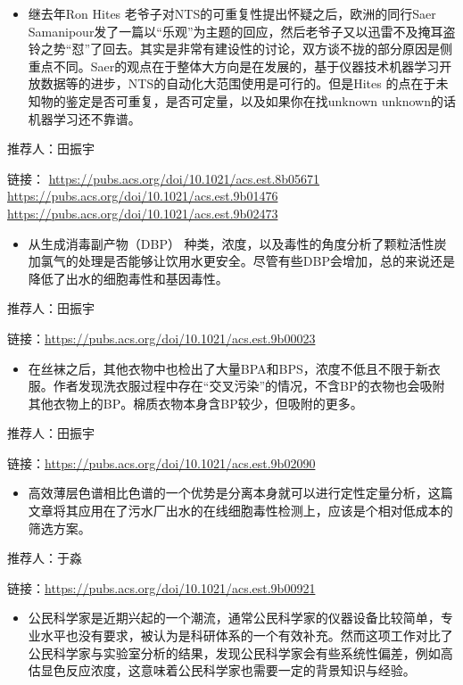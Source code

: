 \documentclass[
]{book}
\providecommand{\tightlist}{%
  \setlength{\itemsep}{0pt}\setlength{\parskip}{0pt}}
\begin{document}
\begin{itemize}
\tightlist
\item
  继去年Ron Hites 老爷子对NTS的可重复性提出怀疑之后，欧洲的同行Saer Samanipour发了一篇以``乐观''为主题的回应，然后老爷子又以迅雷不及掩耳盗铃之势``怼''了回去。其实是非常有建设性的讨论，双方谈不拢的部分原因是侧重点不同。Saer的观点在于整体大方向是在发展的，基于仪器技术机器学习开放数据等的进步，NTS的自动化大范围使用是可行的。但是Hites 的点在于未知物的鉴定是否可重复，是否可定量，以及如果你在找unknown unknown的话机器学习还不靠谱。
\end{itemize}

推荐人：田振宇

链接：
\url{https://pubs.acs.org/doi/10.1021/acs.est.8b05671}
\url{https://pubs.acs.org/doi/10.1021/acs.est.9b01476}
\url{https://pubs.acs.org/doi/10.1021/acs.est.9b02473}

\begin{itemize}
\tightlist
\item
  从生成消毒副产物（DBP） 种类，浓度，以及毒性的角度分析了颗粒活性炭加氯气的处理是否能够让饮用水更安全。尽管有些DBP会增加，总的来说还是降低了出水的细胞毒性和基因毒性。
\end{itemize}

推荐人：田振宇

链接：\url{https://pubs.acs.org/doi/10.1021/acs.est.9b00023}

\begin{itemize}
\tightlist
\item
  在丝袜之后，其他衣物中也检出了大量BPA和BPS，浓度不低且不限于新衣服。作者发现洗衣服过程中存在``交叉污染''的情况，不含BP的衣物也会吸附其他衣物上的BP。棉质衣物本身含BP较少，但吸附的更多。
\end{itemize}

推荐人：田振宇

链接：\url{https://pubs.acs.org/doi/10.1021/acs.est.9b02090}

\begin{itemize}
\tightlist
\item
  高效薄层色谱相比色谱的一个优势是分离本身就可以进行定性定量分析，这篇文章将其应用在了污水厂出水的在线细胞毒性检测上，应该是个相对低成本的筛选方案。
\end{itemize}

推荐人：于淼

链接：\url{https://pubs.acs.org/doi/10.1021/acs.est.9b00921}

\begin{itemize}
\tightlist
\item
  公民科学家是近期兴起的一个潮流，通常公民科学家的仪器设备比较简单，专业水平也没有要求，被认为是科研体系的一个有效补充。然而这项工作对比了公民科学家与实验室分析的结果，发现公民科学家会有些系统性偏差，例如高估显色反应浓度，这意味着公民科学家也需要一定的背景知识与经验。
\end{itemize}
\end{document}
